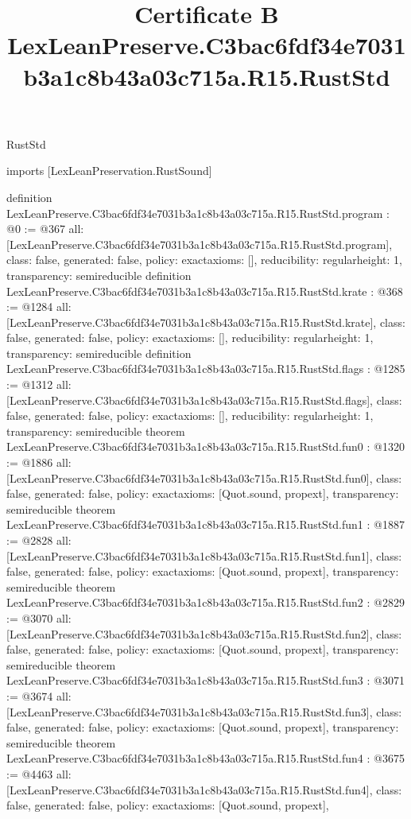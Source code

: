 \begin{lexlean}{RustStd}
\title{Certificate B LexLeanPreserve.C3bac6fdf34e7031b3a1c8b43a03c715a.R15.RustStd}
\begin{coremodule}
imports [LexLeanPreservation.RustSound]

definition LexLeanPreserve.C3bac6fdf34e7031b3a1c8b43a03c715a.R15.RustStd.program : @0 := @367 {
  all: [LexLeanPreserve.C3bac6fdf34e7031b3a1c8b43a03c715a.R15.RustStd.program],
  class: false,
  generated: false,
  policy: exact{axioms: []},
  reducibility: regular{height: 1},
  transparency: semireducible
}
definition LexLeanPreserve.C3bac6fdf34e7031b3a1c8b43a03c715a.R15.RustStd.krate : @368 := @1284 {
  all: [LexLeanPreserve.C3bac6fdf34e7031b3a1c8b43a03c715a.R15.RustStd.krate],
  class: false,
  generated: false,
  policy: exact{axioms: []},
  reducibility: regular{height: 1},
  transparency: semireducible
}
definition LexLeanPreserve.C3bac6fdf34e7031b3a1c8b43a03c715a.R15.RustStd.flags : @1285 := @1312 {
  all: [LexLeanPreserve.C3bac6fdf34e7031b3a1c8b43a03c715a.R15.RustStd.flags],
  class: false,
  generated: false,
  policy: exact{axioms: []},
  reducibility: regular{height: 1},
  transparency: semireducible
}
theorem LexLeanPreserve.C3bac6fdf34e7031b3a1c8b43a03c715a.R15.RustStd.fun0 : @1320 := @1886 {
  all: [LexLeanPreserve.C3bac6fdf34e7031b3a1c8b43a03c715a.R15.RustStd.fun0],
  class: false,
  generated: false,
  policy: exact{axioms: [Quot.sound, propext]},
  transparency: semireducible
}
theorem LexLeanPreserve.C3bac6fdf34e7031b3a1c8b43a03c715a.R15.RustStd.fun1 : @1887 := @2828 {
  all: [LexLeanPreserve.C3bac6fdf34e7031b3a1c8b43a03c715a.R15.RustStd.fun1],
  class: false,
  generated: false,
  policy: exact{axioms: [Quot.sound, propext]},
  transparency: semireducible
}
theorem LexLeanPreserve.C3bac6fdf34e7031b3a1c8b43a03c715a.R15.RustStd.fun2 : @2829 := @3070 {
  all: [LexLeanPreserve.C3bac6fdf34e7031b3a1c8b43a03c715a.R15.RustStd.fun2],
  class: false,
  generated: false,
  policy: exact{axioms: [Quot.sound, propext]},
  transparency: semireducible
}
theorem LexLeanPreserve.C3bac6fdf34e7031b3a1c8b43a03c715a.R15.RustStd.fun3 : @3071 := @3674 {
  all: [LexLeanPreserve.C3bac6fdf34e7031b3a1c8b43a03c715a.R15.RustStd.fun3],
  class: false,
  generated: false,
  policy: exact{axioms: [Quot.sound, propext]},
  transparency: semireducible
}
theorem LexLeanPreserve.C3bac6fdf34e7031b3a1c8b43a03c715a.R15.RustStd.fun4 : @3675 := @4463 {
  all: [LexLeanPreserve.C3bac6fdf34e7031b3a1c8b43a03c715a.R15.RustStd.fun4],
  class: false,
  generated: false,
  policy: exact{axioms: [Quot.sound, propext]},
}
\end{coremodule}
\end{lexlean}
